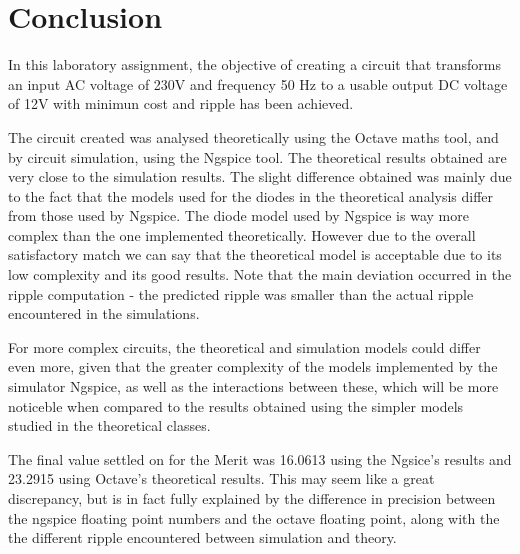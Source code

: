 \section{Conclusion}
\label{sec:conclusion}

In this laboratory assignment, the objective of creating a circuit that transforms an input AC voltage of 230V and frequency 50 Hz to a usable output DC voltage of 12V with minimun cost and ripple has been achieved.\par
The circuit created was analysed theoretically using the Octave maths tool, and by circuit simulation, using the
Ngspice tool. The theoretical results obtained are very close to the simulation results. The slight difference obtained was mainly due to the fact that the models used for the diodes in the theoretical analysis differ from those used by Ngspice. The diode model used by Ngspice is way more complex than the one implemented theoretically. However due to the overall satisfactory match we can say that the theoretical model is acceptable due to its low complexity and its good results. Note that the main deviation occurred in the ripple computation - the predicted ripple was smaller than the actual ripple encountered in the simulations.\par
 For more complex circuits, the
theoretical and simulation models could differ even more, given that the greater complexity of the models implemented by the simulator Ngspice, as well as the interactions between these, which will be more noticeble when compared to the results obtained using the simpler models studied in the theoretical classes.\par
The final value settled on for the Merit was 16.0613 using the Ngsice's results and 23.2915 using Octave's theoretical results. This may seem like a great discrepancy, but is in fact fully explained by the difference in precision between the ngspice floating point numbers and the octave floating point, along with the the different ripple encountered between simulation and theory.

